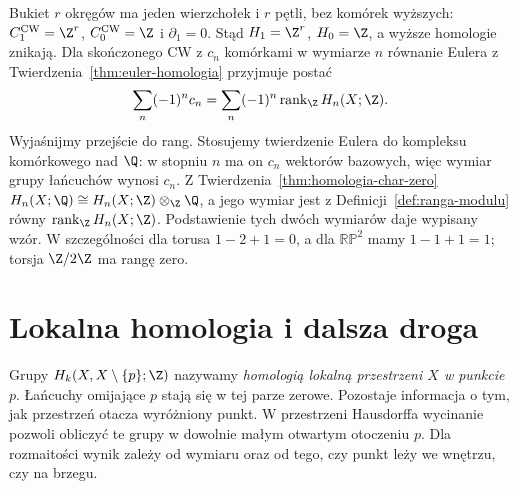 \begin{przyklad}
\label{prz:homologia-bukiet}
Bukiet $r$ okręgów ma jeden
wierzchołek i $r$ pętli,
bez komórek wyższych:
$C_1^{\mathrm{CW}}=\Z^r$,
$C_0^{\mathrm{CW}}=\Z$ i
$\partial_1=0$.
Stąd $H_1=\Z^r$, $H_0=\Z$,
a wyższe homologie znikają.
Dla skończonego CW z
$c_n$ komórkami w wymiarze $n$
równanie Eulera z
Twierdzenia~\ref{thm:euler-homologia}
przyjmuje postać
\[
 \sum_n(-1)^n c_n
 =\sum_n(-1)^n
   \operatorname{rank}_{\Z} H_n(X;\Z).
\]
Wyjaśnijmy przejście do rang. Stosujemy twierdzenie Eulera
do kompleksu komórkowego nad $\Q$:
w stopniu $n$ ma on $c_n$ wektorów bazowych,
więc wymiar grupy łańcuchów wynosi $c_n$.
Z Twierdzenia~\ref{thm:homologia-char-zero}
$H_n(X;\Q)\cong H_n(X;\Z)\otimes_{\Z}\Q$,
a jego wymiar jest z Definicji~\ref{def:ranga-modulu}
równy $\operatorname{rank}_{\Z}H_n(X;\Z)$.
Podstawienie tych dwóch wymiarów daje wypisany wzór.
W szczególności dla torusa
$1-2+1=0$, a dla
$\mathbb{RP}^2$ mamy
$1-1+1=1$; torsja
$\Z/2\Z$ ma rangę zero.
\end{przyklad}


\section{Lokalna homologia i dalsza droga}
\label{sec:lokalna-homologia}

Grupy $H_k(X,X\setminus\{p\};\Z)$ nazywamy
\emph{homologią lokalną przestrzeni $X$ w punkcie $p$}.
Łańcuchy omijające $p$ stają się w tej parze zerowe.
Pozostaje informacja o tym, jak przestrzeń otacza wyróżniony punkt.
W przestrzeni Hausdorffa wycinanie pozwoli obliczyć te grupy
w dowolnie małym otwartym otoczeniu $p$. Dla rozmaitości wynik zależy od
wymiaru oraz od tego, czy punkt leży we wnętrzu, czy na brzegu.

